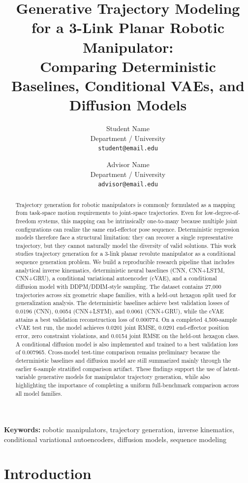 \documentclass[11pt]{article}
\title{Generative Trajectory Modeling for a 3-Link Planar Robotic Manipulator:\\
Comparing Deterministic Baselines, Conditional VAEs, and Diffusion Models}
\author{
    Student Name\\
    Department / University\\
    \texttt{student@email.edu}
    \and
    Advisor Name\\
    Department / University\\
    \texttt{advisor@email.edu}
}
\date{}
\begin{document}
\maketitle

\begin{abstract}
Trajectory generation for robotic manipulators is commonly formulated as a mapping from task-space motion requirements to joint-space trajectories. Even for low-degree-of-freedom systems, this mapping can be intrinsically one-to-many because multiple joint configurations can realize the same end-effector pose sequence. Deterministic regression models therefore face a structural limitation: they can recover a single representative trajectory, but they cannot naturally model the diversity of valid solutions. This work studies trajectory generation for a 3-link planar revolute manipulator as a conditional sequence generation problem. We build a reproducible research pipeline that includes analytical inverse kinematics, deterministic neural baselines (CNN, CNN+LSTM, CNN+GRU), a conditional variational autoencoder (cVAE), and a conditional diffusion model with DDPM/DDIM-style sampling. The dataset contains 27,000 trajectories across six geometric shape families, with a held-out hexagon split used for generalization analysis. The deterministic baselines achieve best validation losses of 0.0196 (CNN), 0.0054 (CNN+LSTM), and 0.0061 (CNN+GRU), while the cVAE attains a best validation reconstruction loss of 0.000774. On a completed 4,500-sample cVAE test run, the model achieves 0.0201 joint RMSE, 0.0291 end-effector position error, zero constraint violations, and 0.0154 joint RMSE on the held-out hexagon class. A conditional diffusion model is also implemented and trained to a best validation loss of 0.007965. Cross-model test-time comparison remains preliminary because the deterministic baselines and diffusion model are still summarized mainly through the earlier 6-sample stratified comparison artifact. These findings support the use of latent-variable generative models for manipulator trajectory generation, while also highlighting the importance of completing a uniform full-benchmark comparison across all model families.
\end{abstract}

\noindent\textbf{Keywords:} robotic manipulators, trajectory generation, inverse kinematics, conditional variational autoencoders, diffusion models, sequence modeling

\section{Introduction}
\end{document}
